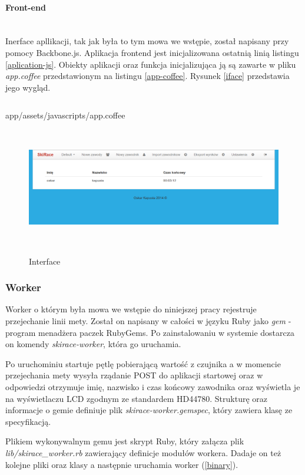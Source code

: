 \documentclass[11pt,a4paper, twoside]{article}
\begin{document}
\paragraph{Front-end} ~\\
Inerface apllikacji, tak jak była to tym mowa we wstępie, został napisany przy pomocy Backbone.js. Aplikacja frontend jest inicjalizowana ostatnią linią listingu \ref{aplication-js}. Obiekty aplikacji oraz funkcja inicjalizująca ją są zawarte w pliku \emph{app.coffee} przedstawionym na listingu \ref{app-coffee}. Rysunek \ref{iface} przedstawia jego wygląd.
\begin{listing}[H]
\inputminted{js}{./src/app.coffee}
\caption{app/assets/javascripts/app.coffee}
$\label{app-coffee}$
\end{listing}
\begin{figure}[ht]
\includegraphics[scale=0.35]{./img/interface.png}
\caption{Interface}
$\label{iface}$
\end{figure}
\newpage
\subsubsection{Worker}
Worker o którym była mowa we wstępie do niniejszej pracy rejestruje przejechanie linii mety. Został on napisany w całości w języku Ruby jako \emph{gem} - program menadżera paczek RubyGems. Po zainstalowaniu w systemie dostarcza on komendy \emph{skirace-worker}, która go uruchamia.


Po uruchominiu startuje pętlę pobierającą wartość z czujnika a w momencie przejechania mety wysyła rządanie POST do aplikacji startowej oraz w odpowiedzi otrzymuje imię, nazwisko i czas końcowy zawodnika oraz wyświetla je na wyświetlaczu LCD zgodnym ze standardem HD44780. Strukturę oraz informacje o gemie definiuje plik \emph{skirace-worker.gemspec}, który zawiera klasę ze specyfikacją.

Plikiem wykonywalnym gemu jest skrypt Ruby, który załącza plik \emph{lib/skirace\_worker.rb} zawierający definicje modułów workera. Dadaje on też kolejne pliki oraz klasy a następnie uruchamia worker (\ref{binary}). 
\end{document}
